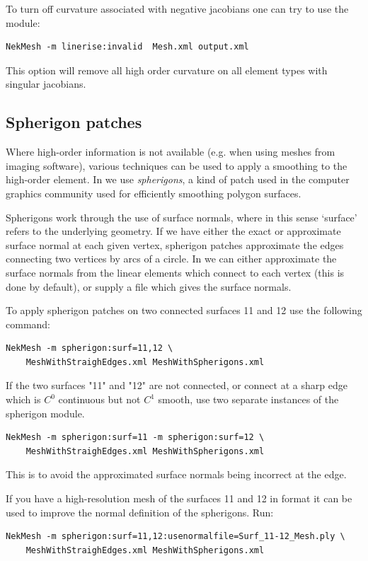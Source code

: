 To turn off curvature associated with negative jacobians one can try to use the
 module:
\begin{lstlisting}[style=BashInputStyle]
NekMesh -m linerise:invalid  Mesh.xml output.xml
\end{lstlisting}
This option will remove all high order curvature on all element types
with singular jacobians.

\subsection{Spherigon patches}

Where high-order information is not available (e.g. when using meshes from
imaging software), various techniques can be used to apply a smoothing to the
high-order element. In \nm we use \emph{spherigons}, a kind of patch used in the
computer graphics community used for efficiently smoothing polygon surfaces.

Spherigons work through the use of surface normals, where in this sense
`surface' refers to the underlying geometry. If we have either the exact or
approximate surface normal at each given vertex, spherigon patches approximate
the edges connecting two vertices by arcs of a circle. In \nm we can either
approximate the surface normals from the linear elements which connect to each
vertex (this is done by default), or supply a file which gives the surface
normals.

To apply spherigon patches on two connected surfaces 11 and 12 use the following
command:
%
\begin{lstlisting}[style=BashInputStyle]
NekMesh -m spherigon:surf=11,12 \
    MeshWithStraighEdges.xml MeshWithSpherigons.xml
\end{lstlisting}
%
If the two surfaces "11" and "12" are not connected, or connect at a sharp edge
which is $C^0$ continuous but not $C^1$ smooth, use two separate instances of
the spherigon module.
%
\begin{lstlisting}[style=BashInputStyle]
NekMesh -m spherigon:surf=11 -m spherigon:surf=12 \
    MeshWithStraighEdges.xml MeshWithSpherigons.xml
\end{lstlisting}
%
This is to avoid the approximated surface normals being incorrect at the edge.

If you have a high-resolution mesh of the surfaces 11 and 12 in \inltt{ply}
format it can be used to improve the normal definition of the spherigons. Run:
\begin{lstlisting}[style=BashInputStyle]
NekMesh -m spherigon:surf=11,12:usenormalfile=Surf_11-12_Mesh.ply \
    MeshWithStraighEdges.xml MeshWithSpherigons.xml
\end{lstlisting}

